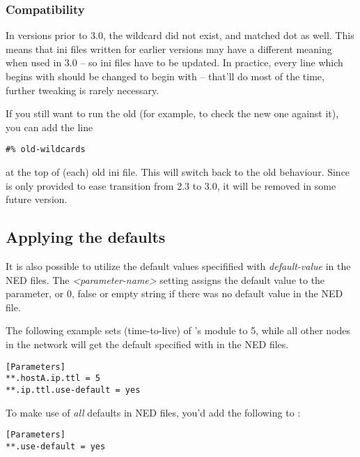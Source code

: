 \subsubsection{Compatibility}

In {\opp} versions prior to 3.0, the \ttt{**} wildcard did not exist, and \ttt{*}
matched dot as well. This means that ini files written for earlier {\opp}
versions may have a different meaning when used in {\opp} 3.0 -- so
ini files have to be updated. In practice, every line which begins
with  should be changed to begin with  -- that'll do most
of the time, further tweaking is rarely necessary.

If you still want to run the old  (for example, to check the new one
against it), you can add the line

\begin{verbatim}
#% old-wildcards
\end{verbatim}

at the top of (each) old ini file. This will switch back to the old
behaviour. Since  is only provided to ease transition
from {\opp} 2.3 to 3.0, it will be removed in some future version.


\subsection{Applying the defaults}

It is also possible to utilize the default values specifified with
\textit{default-value}\ttt{)} in the NED files.
The \textit{<parameter-name>} setting assigns
the default value to the parameter, or 0, false or empty string if
there was no default value in the NED file.

The following example sets  (time-to-live) of 's
 module to 5, while all other nodes in the network
will get the default specified with  in the NED files.

\begin{Verbatim}[commandchars=\\\{\}]
[Parameters]
**.hostA.ip.ttl = 5
**.ip.ttl.use-default = yes
\end{Verbatim}

To make use of \textit{all} defaults in NED files, you'd add the following to
:

\begin{verbatim}
[Parameters]
**.use-default = yes
\end{verbatim}


